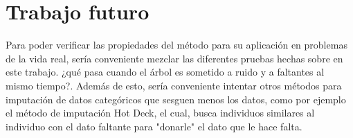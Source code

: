 \documentclass[]{article}
\begin{document}
\section*{Trabajo futuro}
Para poder verificar las propiedades del método para su aplicación en problemas de la vida real, sería conveniente mezclar las diferentes pruebas hechas sobre en este trabajo. ¿qué pasa cuando el árbol es sometido a ruido y a faltantes al mismo tiempo?. Además de esto, sería conveniente intentar otros métodos para imputación de datos categóricos que sesguen menos los datos, como por ejemplo el método de imputación Hot Deck, el cual, busca individuos similares al individuo con el dato faltante para "donarle" el dato que le hace falta. \cite{Rodgers1984}

	




\end{document}
